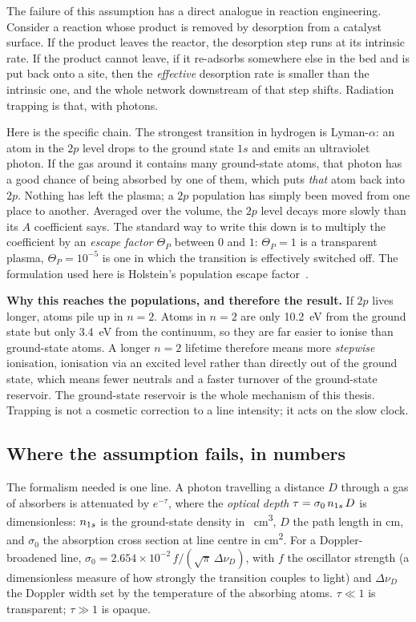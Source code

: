 The failure of this assumption has a direct analogue in reaction engineering.
Consider a reaction whose product is removed by desorption from a catalyst
surface. If the product leaves the reactor, the desorption step runs at its
intrinsic rate. If the product cannot leave, if it re-adsorbs somewhere else
in the bed and is put back onto a site, then the \emph{effective} desorption
rate is smaller than the intrinsic one, and the whole network downstream of that
step shifts. Radiation trapping is that, with photons.

Here is the specific chain. The strongest transition in hydrogen is
Lyman-$\alpha$: an atom in the $2p$ level drops to the ground state $1s$ and
emits an ultraviolet photon. If the gas around it contains many ground-state
atoms, that photon has a good chance of being absorbed by one of them, which
puts \emph{that} atom back into $2p$. Nothing has left the plasma; a
$2p$ population has simply been moved from one place to another. Averaged over
the volume, the $2p$ level decays more slowly than its $A$ coefficient says. The
standard way to write this down is to multiply the coefficient by an
\emph{escape factor} $\Theta_P$ between $0$ and $1$: $\Theta_P = 1$ is a
transparent plasma, $\Theta_P = 10^{-5}$ is one in which the transition is
effectively switched off. The formulation used here is Holstein's population
escape factor~\cite{Holstein1947}.

\textbf{Why this reaches the populations, and therefore the result.} If $2p$
lives longer, atoms pile up in $n=2$. Atoms in $n=2$ are only
\SI{10.2}{\electronvolt} from the ground state but only
\SI{3.4}{\electronvolt} from the continuum, so they are far easier to ionise
than ground-state atoms. A longer $n=2$ lifetime therefore means more
\emph{stepwise} ionisation, ionisation via an excited level rather than
directly out of the ground state, which means fewer neutrals and a faster
turnover of the ground-state reservoir. The ground-state reservoir is the whole
mechanism of this thesis. Trapping is not a cosmetic correction to a line
intensity; it acts on the slow clock.

\subsection{Where the assumption fails, in numbers}

The formalism needed is one line. A photon travelling a distance $D$ through a
gas of absorbers is attenuated by $e^{-\tau}$, where the \emph{optical depth}
$\tau = \sigma_0\,n_{1s}\,D$ is dimensionless: $n_{1s}$ is the ground-state density
in \si{\per\cubic\centi\metre}, $D$ the path length in \si{\centi\metre}, and
$\sigma_0$ the absorption cross section at line centre in
\si{\square\centi\metre}. For a Doppler-broadened line,
$\sigma_0 = 2.654\times10^{-2}\,f/(\sqrt{\pi}\,\Delta\nu_D)$, with $f$ the
oscillator strength (a dimensionless measure of how strongly the transition
couples to light) and $\Delta\nu_D$ the Doppler width set by the temperature of
the absorbing atoms. $\tau \ll 1$ is transparent; $\tau \gg 1$ is opaque.

